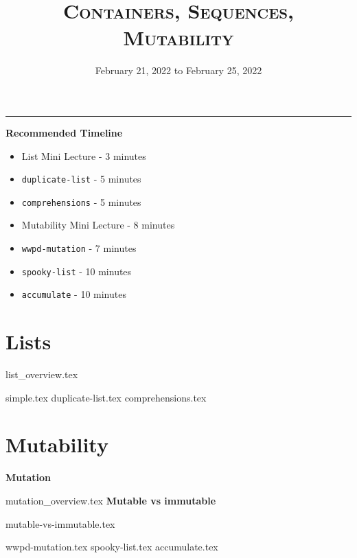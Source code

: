 \documentclass{exam}
\title{\textsc{Containers, Sequences, Mutability}}
\date{February 21, 2022 to February 25, 2022}
\begin{document}
	\maketitle
	\rule{\textwidth}{0.15em}
	\fontsize{12}{15}\selectfont

\begin{guide}
	\textbf{Recommended Timeline}
	\begin{itemize}
		\item List Mini Lecture - 3 minutes
		\item \lstinline{duplicate-list} - 5 minutes
		\item \lstinline{comprehensions} - 5 minutes
		\item Mutability Mini Lecture - 8 minutes
		\item \lstinline{wwpd-mutation} - 7 minutes
		\item \lstinline{spooky-list} - 10 minutes
		\item \lstinline{accumulate} - 10 minutes
	\end{itemize}
\end{guide}

\section{Lists}
{list_overview.tex}
\newpage
\begin{questions}
{simple.tex}
\newpage
{duplicate-list.tex}
\newpage
{comprehensions.tex}
\end{questions}

\newpage

\section{Mutability}
\textbf{Mutation}

{mutation_overview.tex}
\textbf{Mutable vs immutable}

{mutable-vs-immutable.tex}

\begin{questions}
{wwpd-mutation.tex}
\newpage
{spooky-list.tex}
\newpage
{accumulate.tex}
\end{questions}
\end{document}

